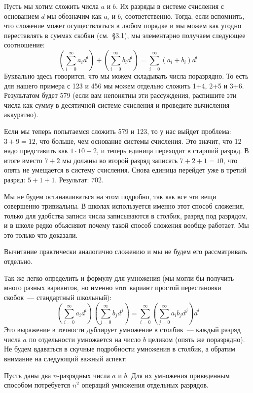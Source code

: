 Пусть мы хотим сложить числа $a$ и $b$. Их разряды в системе счисления с основанием $d$ мы обозначим как $a_i$ и $b_i$ соответственно. Тогда, если вспомнить, что сложение может осуществляться в любом порядке и мы можем как угодно переставлять в суммах скобки (см.~\S3.1), мы элементарно получаем следующее соотношение:
$$\left(\sum_{i=0}^\infty a_i d^i\right) + \left(\sum_{i=0}^\infty b_i d^i\right) = \sum_{i=0}^\infty (a_i + b_i) d^i$$
Буквально здесь говорится, что мы можем складывать числа поразрядно. То есть для нашего примера с 123 и 456 мы можем отдельно сложить 1+4, 2+5 и 3+6. Результатом будет 579 (если вам непонятны эти рассуждения, распишите эти числа как сумму в десятичной системе счисления и проведите вычисления аккуратно).

Если мы теперь попытаемся сложить 579 и 123, то у нас выйдет проблема: $3+9=12$, что больше, чем основание системы счисления. Это значит, что 12 надо представить как $1\cdot10 + 2$, и теперь единица переходит в старший разряд. В итоге вместо $7+2$ мы должны во второй разряд записать $7+2+1=10$, что опять не умещается в систему счисления. Снова единица перейдет уже в третий разряд: $5+1+1$. Результат: 702.

Мы не будем останавливаться на этом подробно, так как все эти вещи совершенно тривиальны. В школах используется именно этот способ сложения, только для удобства записи числа записываются в столбик, разряд под разрядом, и в школе редко объясняют почему такой способ сложения вообще работает. Мы это только что доказали.

Вычитание практически аналогично сложению и мы не будем его рассматривать отдельно.

Так же легко определить и формулу для умножения (мы могли бы получить много разных вариантов, но именно этот вариант простой перестановки скобок~--- стандартный школьный):
$$\left(\sum_{i=0}^\infty a_i d^i \right)\left( \sum_{j=0}^\infty b_j d^j \right) = \sum_{i=0}^\infty \left(\sum_{j=0}^\infty a_i b_j d^j \right)d^i$$
Это выражение в точности дублирует умножение в столбик~--- каждый разряд числа $a$ по отдельности умножается на число $b$ целиком (опять же поразрядно). Не будем вдаваться в скучные подробности умножения в столбик, а обратим внимание на следующий важный аспект:

\begin{exercise}
Пусть даны два $n$-разрядных числа $a$ и $b$. Для их умножения приведенным способом потребуется $n^2$ операций умножения отдельных разрядов.
\end{exercise}

